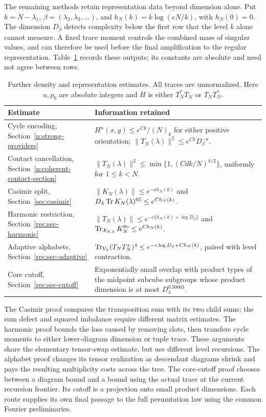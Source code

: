The remaining methods retain representation data beyond dimension
alone. Put $k=N-\lambda_1$, $\beta=(\lambda_2,\lambda_3,\ldots)$,
and $h_N(k)=k\log(eN/k)$, with $h_N(0)=0$. The dimension $D_\beta$
detects complexity below the first row that the level $k$ alone cannot
measure. A fixed trace moment controls the combined mass of singular
values, and can therefore be used before the final amplification to
the regular representation. Table~\ref{tab:methods} records these
outputs; its constants are absolute and need not agree between rows.
\begin{table}[ht]
\centering
\small
\begin{tabular}{@{}>{\raggedright\arraybackslash}p{.24\linewidth}>{\raggedright\arraybackslash}p{.66\linewidth}@{}}
\toprule
Estimate & Information retained \\
\midrule
Cycle encoding, Section~\ref{n:strong-providers}
 & $H^u(x,y)\le e^{Ck}/(N)_k$ for either positive orientation;
 $\|T_N(\lambda)\|^2\le e^{Ck}D_\beta^{-a}$. \\
Contact cancellation, Section~\ref{n:coherent-contact-section}
 & $\|T_N(\lambda)\|^2\le\min\{1,(Cdk/N)^{k/2}\}$,
 uniformly for $1\le k<N$. \\
Casimir split, Section~\ref{sec:casimir}
 & $\|K_N(\lambda)\|\le e^{-a h_N(k)}$ and
 $D_\lambda\operatorname{Tr} K_N(\lambda)^{65}\le e^{C h_N(k)}$. \\
Harmonic restriction, Section~\ref{rec:sec-harmonic}
 & $\|T_N(\lambda)\|\le e^{-c\{h_N(k)+\log D_\beta\}}$ and
 $\operatorname{Tr}_{\mathcal X_{N,k}}K_N^{p_0}\le e^{C h_N(k)}$. \\
Adaptive alphabets, Section~\ref{rec:sec-adaptive}
 & $\operatorname{Tr}_{V_\lambda}(T_NT_N^*)^4
 \le e^{-c\log D_\lambda+C h_N(k)}$, paired with level contraction. \\
Core cutoff, Section~\ref{rec:sec-cutoff}
 & Exponentially small overlap with product types of the midpoint
 subcube subgroups whose product dimension is at most
 $D_\lambda^{0.50003}$. \\
\bottomrule
\end{tabular}
\caption{Further density and representation estimates.
All traces are unnormalized. Here $u,p_0$ are absolute integers and
$H$ is either $T_N^*T_N$ or $T_NT_N^*$.}
\label{tab:methods}
\end{table}

The Casimir proof compares the transposition sum with its two child
sums; the sum defect and squared imbalance require different matrix
estimates. The harmonic proof bounds the loss caused by removing
slots, then transfers cycle moments to either lower-diagram dimension
or tuple trace. These arguments share the elementary tensor-swap
estimate, but use different level recursions. The alphabet proof
changes its tensor realization as descendant diagrams shrink and pays
the resulting multiplicity costs across the tree. The core-cutoff
proof chooses between a diagram bound and a bound using the actual
trace at the current recursion frontier. Its cutoff is a projection
onto small product dimensions. Each route supplies its own final
passage to the full permutation law using the common Fourier
preliminaries.

